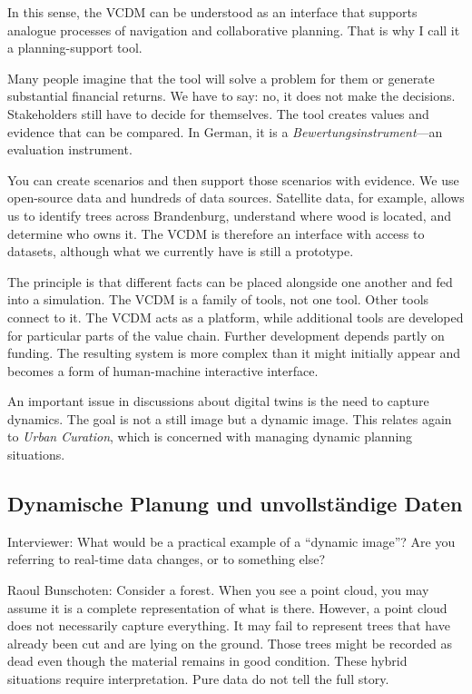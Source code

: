 In this sense, the VCDM can be understood as an interface that supports analogue processes of navigation and collaborative planning. That is why I call it a planning-support tool.

Many people imagine that the tool will solve a problem for them or generate substantial financial returns. We have to say: no, it does not make the decisions. Stakeholders still have to decide for themselves. The tool creates values and evidence that can be compared. In German, it is a \textit{Bewertungsinstrument}—an evaluation instrument.

You can create scenarios and then support those scenarios with evidence. We use open-source data and hundreds of data sources. Satellite data, for example, allows us to identify trees across Brandenburg, understand where wood is located, and determine who owns it. The VCDM is therefore an interface with access to datasets, although what we currently have is still a prototype.

The principle is that different facts can be placed alongside one another and fed into a simulation. The VCDM is a family of tools, not one tool. Other tools connect to it. The VCDM acts as a platform, while additional tools are developed for particular parts of the value chain. Further development depends partly on funding. The resulting system is more complex than it might initially appear and becomes a form of human-machine interactive interface.

An important issue in discussions about digital twins is the need to capture dynamics. The goal is not a still image but a dynamic image. This relates again to \textit{Urban Curation}, which is concerned with managing dynamic planning situations.

\subsection{Dynamische Planung und unvollständige Daten}

Interviewer: What would be a practical example of a “dynamic image”? Are you referring to real-time data changes, or to something else?

Raoul Bunschoten: Consider a forest. When you see a point cloud, you may assume it is a complete representation of what is there. However, a point cloud does not necessarily capture everything. It may fail to represent trees that have already been cut and are lying on the ground. Those trees might be recorded as dead even though the material remains in good condition. These hybrid situations require interpretation. Pure data do not tell the full story.

